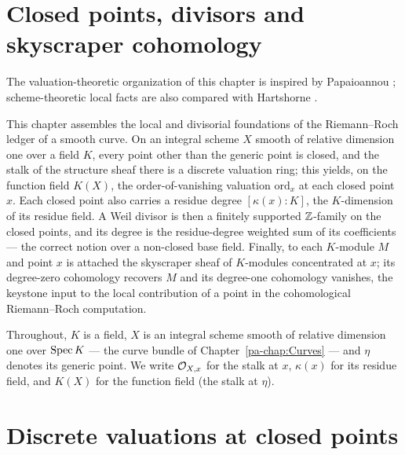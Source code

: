 \section{Closed points, divisors and skyscraper cohomology}
\label{pa-chap:RiemannRoch}

The valuation-theoretic organization of this chapter is inspired by Papaioannou
\cite{papaioannou-rr}; scheme-theoretic local facts are also compared with Hartshorne
\cite{hartshorne-ag}.

This chapter assembles the local and divisorial foundations of the Riemann--Roch ledger of a
smooth curve. On an integral scheme \(X\) smooth of relative dimension one over a field \(K\),
every point other than the generic point is closed, and the stalk of the structure sheaf there
is a discrete valuation ring; this yields, on the function field \(K(X)\), the order-of-vanishing
valuation \(\mathrm{ord}_x\) at each closed point \(x\). Each closed point also carries a residue
degree \([\kappa(x) : K]\), the \(K\)-dimension of its residue field. A Weil divisor is then a
finitely supported \(\mathbb{Z}\)-family on the closed points, and its degree is the residue-degree
weighted sum of its coefficients --- the correct notion over a non-closed base field. Finally, to
each \(K\)-module \(M\) and point \(x\) is attached the skyscraper sheaf of \(K\)-modules
concentrated at \(x\); its degree-zero cohomology recovers \(M\) and its degree-one cohomology
vanishes, the keystone input to the local contribution of a point in the cohomological
Riemann--Roch computation.

Throughout, \(K\) is a field, \(X\) is an integral scheme smooth of relative dimension one over
\(\operatorname{Spec} K\) --- the curve bundle of Chapter~\ref{pa-chap:Curves} --- and \(\eta\) denotes its generic
point. We write \(\mathcal{O}_{X,x}\) for the stalk at \(x\), \(\kappa(x)\) for its residue field,
and \(K(X)\) for the function field (the stalk at \(\eta\)).

\section{Discrete valuations at closed points}

